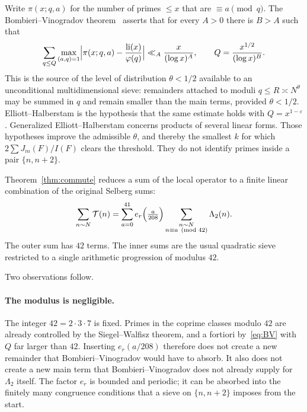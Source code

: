\documentclass[11pt,a4paper]{article}
\theoremstyle{plain}
\theoremstyle{definition}
\theoremstyle{plain}
\numberwithin{equation}{section}
\begin{document}
Write \(\pi(x;q,a)\) for the number of primes \(\le x\) that are \(\equiv a\pmod{q}\). The Bombieri--Vinogradov theorem~\cite{Bombieri1965,Vinogradov1965} asserts that for every \(A>0\) there is \(B>A\) such that
\begin{equation}
\label{eq:BV}
\sum_{q\le Q}\max_{(a,q)=1}\Bigl|\pi(x;q,a)-\frac{\operatorname{li}(x)}{\varphi(q)}\Bigr|
\ll_A \frac{x}{(\log x)^A},
\qquad Q=\frac{x^{1/2}}{(\log x)^B}.
\end{equation}
This is the source of the level of distribution \(\theta<1/2\) available to an unconditional multidimensional sieve: remainders attached to moduli \(q\le R\asymp N^{\theta}\) may be summed in \(q\) and remain smaller than the main terms, provided \(\theta<1/2\). Elliott--Halberstam is the hypothesis that the same estimate holds with \(Q=x^{1-\varepsilon}\). Generalized Elliott--Halberstam concerns products of several linear forms. Those hypotheses improve the admissible \(\theta\), and thereby the smallest \(k\) for which \(2\sum J_m(F)/I(F)\) clears the threshold. They do not identify primes inside a pair \(\{n,n+2\}\).

Theorem~\ref{thm:commute} reduces a sum of the local operator to a finite linear combination of the original Selberg sums:
\begin{equation}
\label{eq:split}
\sum_{n\sim N}\mathcal{T}(n)
=\sum_{a=0}^{41}e_r\Bigl(\tfrac{a}{208}\Bigr)
\sum_{\substack{n\sim N\\ n\equiv a\pmod{42}}}\Lambda_2(n).
\end{equation}
The outer sum has \(42\) terms. The inner sums are the usual quadratic sieve restricted to a single arithmetic progression of modulus \(42\).

Two observations follow.

\paragraph{The modulus is negligible.}
The integer \(42=2\cdot 3\cdot 7\) is fixed. Primes in the coprime classes modulo \(42\) are already controlled by the Siegel--Walfisz theorem, and a fortiori by~\eqref{eq:BV} with \(Q\) far larger than \(42\). Inserting \(e_r(a/208)\) therefore does not create a new remainder that Bombieri--Vinogradov would have to absorb. It also does not create a new main term that Bombieri--Vinogradov does not already supply for \(\Lambda_2\) itself. The factor \(e_r\) is bounded and periodic; it can be absorbed into the finitely many congruence conditions that a sieve on \(\{n,n+2\}\) imposes from the start.
\end{document}
